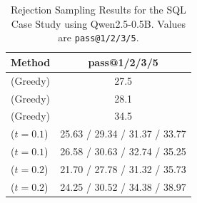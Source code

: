 \begin{table}[h]
    \centering
    \scriptsize
    \caption{Rejection Sampling Results for the SQL Case Study using Qwen2.5-0.5B. Values are \texttt{pass@1/2/3/5}.}
    \begin{tabular}{lc}
        \toprule
        \textbf{Method} & \textbf{pass@1/2/3/5} \\
        \midrule 
        \standard{} (Greedy) & 27.5 \\
        \syncode{} (Greedy) & 28.1 \\
        \Tool{} (Greedy) & 34.5 \\
        \standard{} ($t=0.1$) & 25.63 / 29.34 / 31.37 / 33.77 \\
        \syncode{} ($t=0.1$) & 26.58 / 30.63 / 32.74 / 35.25 \\
        \standard{} ($t=0.2$) & 21.70 / 27.78 / 31.32 / 35.73 \\
        \syncode{} ($t=0.2$) & 24.25 / 30.52 / 34.38 / 38.97 \\
        \bottomrule
    \end{tabular}
    \label{tab:sql_case_study_rej}
\end{table}
